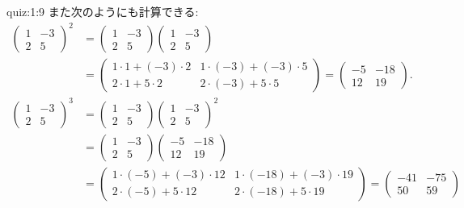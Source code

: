 \begin{answerof}{quiz:1:9}
  また次のようにも計算できる:
  \begin{align*}
    \begin{pmatrix}
      1&-3\\2&5
    \end{pmatrix}^2
    &=
    \begin{pmatrix}
      1&-3\\2&5
    \end{pmatrix}
    \begin{pmatrix}
      1&-3\\2&5
    \end{pmatrix}\\
    &=
    \begin{pmatrix}
      1\cdot 1+(-3)\cdot 2&1\cdot(-3)+(-3)\cdot 5\\2\cdot1 +5\cdot2&2\cdot(-3) +5\cdot5
    \end{pmatrix}
    =
    \begin{pmatrix}
      -5&-18\\12&19
    \end{pmatrix}.
  \\%
    \begin{pmatrix}
      1&-3\\2&5
    \end{pmatrix}^3
    &=
    \begin{pmatrix}
      1&-3\\2&5
    \end{pmatrix}
    \begin{pmatrix}
      1&-3\\2&5
    \end{pmatrix}^2\\
    &=
    \begin{pmatrix}
      1&-3\\2&5
    \end{pmatrix}
    \begin{pmatrix}
      -5&-18\\12&19
    \end{pmatrix}\\
    &=
    \begin{pmatrix}
      1\cdot(-5)+(-3)\cdot 12&1\cdot(-18)+(-3)\cdot 19\\2\cdot(-5) +5\cdot12&2\cdot(-18) +5\cdot19
    \end{pmatrix}
    =
    \begin{pmatrix}
      -41&-75\\50&59

\end{pmatrix}
\end{align*}
\end{answerof}
